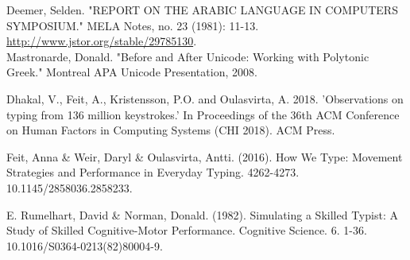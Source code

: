 \documentclass[11pt]{article}
\begin{document}
Deemer, Selden. "REPORT ON THE ARABIC LANGUAGE IN COMPUTERS SYMPOSIUM." MELA Notes, no. 23 (1981): 11-13. \url{http://www.jstor.org/stable/29785130}. \\

Mastronarde, Donald. "Before and After Unicode: Working with Polytonic Greek." Montreal APA Unicode Presentation, 2008.

Dhakal, V., Feit, A., Kristensson, P.O. and Oulasvirta, A. 2018. 'Observations on typing from 136 million keystrokes.' In Proceedings of the 36th ACM Conference on Human Factors in Computing Systems (CHI 2018). ACM Press.

Feit, Anna \& Weir, Daryl \& Oulasvirta, Antti. (2016). How We Type: Movement Strategies and Performance in Everyday Typing. 4262-4273. 10.1145/2858036.2858233. 

E. Rumelhart, David \& Norman, Donald. (1982). Simulating a Skilled Typist: A Study of Skilled Cognitive-Motor Performance. Cognitive Science. 6. 1-36. 10.1016/S0364-0213(82)80004-9. 
\end{document}
